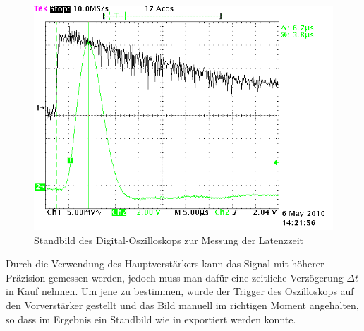 \begin{figure}[htb]
      \centering
      \includegraphics[width=1\columnwidth,keepaspectratio]{messverzoegerung}
      \caption{Standbild des Digital-Oszilloskops zur Messung der Latenzzeit}
      \label{fig:latenz}
\end{figure}

Durch die Verwendung des Hauptverstärkers kann das Signal mit höherer Präzision
gemessen werden, jedoch muss man dafür eine zeitliche Verzögerung $Δt$ in Kauf
nehmen. Um jene zu bestimmen, wurde der Trigger des Oszilloskops auf den
Vorverstärker gestellt und das Bild manuell im richtigen Moment angehalten, so
dass im Ergebnis ein Standbild wie in  exportiert werden konnte.
